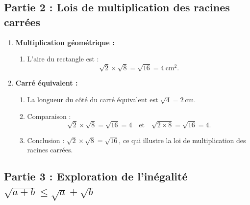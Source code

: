 \documentclass{article}
\begin{document}
\subsection*{Partie 2 : Lois de multiplication des racines carrées}

\begin{enumerate}
    \item \textbf{Multiplication géométrique :}
    \begin{enumerate}
        \item L'aire du rectangle est :
        \[
        \sqrt{2} \times \sqrt{8} = \sqrt{16} = 4~\text{cm}^2.
        \]
    \end{enumerate}
    \item \textbf{Carré équivalent :}
    \begin{enumerate}
        \item La longueur du côté du carré équivalent est $\sqrt{4} = 2~\text{cm}$.
        \item Comparaison :
        \[
        \sqrt{2} \times \sqrt{8} = \sqrt{16} = 4 \quad \text{et} \quad \sqrt{2 \times 8} = \sqrt{16} = 4.
        \]
        \item Conclusion : $\sqrt{2} \times \sqrt{8} = \sqrt{16}$, ce qui illustre la loi de multiplication des racines carrées.
    \end{enumerate}
\end{enumerate}

\subsection*{Partie 3 : Exploration de l'inégalité $\sqrt{a + b} \leq \sqrt{a} + \sqrt{b}$}
\end{document}
